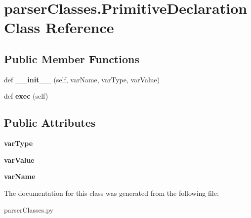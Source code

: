 \hypertarget{classparser_classes_1_1_primitive_declaration}{}\section{parser\+Classes.\+Primitive\+Declaration Class Reference}
\label{classparser_classes_1_1_primitive_declaration}
\subsection*{Public Member Functions}
\begin{DoxyCompactItemize}
\item 
\mbox{\label{classparser_classes_1_1_primitive_declaration_aad9639eb073bcb44bc75a89c944df91b}} 
def {\bfseries \+\_\+\+\_\+init\+\_\+\+\_\+} (self, var\+Name, var\+Type, var\+Value)
\item 
\mbox{\label{classparser_classes_1_1_primitive_declaration_a438696675269a0bcb077b6e60acf7bfd}} 
def {\bfseries exec} (self)
\end{DoxyCompactItemize}
\subsection*{Public Attributes}
\begin{DoxyCompactItemize}
\item 
\mbox{\label{classparser_classes_1_1_primitive_declaration_af0de807df30562cc04fbd425ea1e2ad1}} 
{\bfseries var\+Type}
\item 
\mbox{\label{classparser_classes_1_1_primitive_declaration_a2f493d5ebb420d75e5184c520e2fa66b}} 
{\bfseries var\+Value}
\item 
\mbox{\label{classparser_classes_1_1_primitive_declaration_abda8fb36580c90aea36e32f8d0785f6c}} 
{\bfseries var\+Name}
\end{DoxyCompactItemize}


The documentation for this class was generated from the following file\+:\begin{DoxyCompactItemize}
\item 
parser\+Classes.\+py\end{DoxyCompactItemize}
